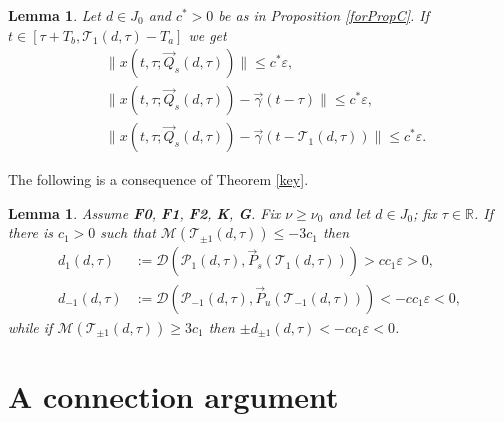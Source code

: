 \documentclass[10pt]{article}
\newtheorem{knownlemma}[knowntheorem]{Lemma}
\numberwithin{equation}{section}
\def\dist{{\mathscr{D}}}
\def\ga{\vec{\gamma}}
\def\ep{\varepsilon}
\def\R{{\mathbb R}}
\def\MM{{\mathcal M}}
\def\TTT{\mathscr{T}}
\def\PPP{\mathscr{P}}
\def\Q{\vec{Q}}
\def\P{\vec{P}}
\newcommand\assump[1]{{\rm\textbf{#1}}}
\theoremstyle{definition}
\theoremstyle{remark}
\begin{document}
\begin{knownlemma}\label{forgotten.origin}\cite[Lemma 4.10]{CFPrestate} %
  Let  $d \in J_0$ and $c^*>0$ be as in Proposition \ref{forPropC}.
  If $t \in [\tau +T_b ,\TTT_1(d,\tau)-T_a]$ we get
  \begin{eqnarray}
   &  \|x(t,\tau ; \Q_s(d,\tau))\| \le  c^* \ep \label{est.origin},  \\
  &  \|x(t,\tau ; \Q_s(d,\tau))- \ga(t-\tau)\| \le  c^* \ep  \label{est.origin-}, \\
  &  \|x(t,\tau ; \Q_s(d,\tau))- \ga(t-\TTT_1(d,\tau))\| \le  c^* \ep \label{est.origin+}.
  \end{eqnarray}
\end{knownlemma}

The following is a consequence of Theorem \ref{key}.

\begin{knownlemma}\label{key1}\cite[Lemma 4.11]{CFPrestate} %
Assume \assump{F0}, \assump{F1}, \assump{F2}, \assump{K}, \assump{G}.
	Fix $\nu \ge \nu_0$ and let $d\in J_0$;
	fix $\tau \in \R$.
If there is $c_1>0$ such that
$\MM(\TTT_{\pm 1}(d,\tau))\le - 3c_1$ then
\begin{equation*}
	\begin{split}
		d_1 (d,\tau) & :=\dist (\PPP_1(d,\tau),\P_s(\TTT_1(d,\tau))) >  cc_1 \ep>0, \\
		d_{-1} (d,\tau) & :=\dist (\PPP_{-1}(d,\tau),\P_u(\TTT_{-1}(d,\tau))) <-cc_1 \ep <0 ,
	\end{split}
\end{equation*}
while if  $\MM(\TTT_{\pm 1}(d,\tau))\ge
3c_1$ then
$\pm d_{\pm1}(d,\tau)<- cc_1\ep<0$.
\end{knownlemma}















\section{A connection argument}    \label{S.connection}
\end{document}
